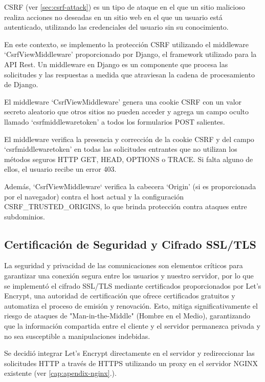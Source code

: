 CSRF (ver \ref{sec:csrf-attack}) es un tipo de ataque en el que un sitio malicioso realiza acciones no deseadas en un sitio web en el que un usuario está autenticado, utilizando las credenciales del usuario sin su conocimiento.

En este contexto, se implemento la protección CSRF utilizando el middleware `CsrfViewMiddleware' proporcionado por Django, el framework utilizado para la API Rest. Un middleware en Django es un componente que procesa las solicitudes y las respuestas a medida que atraviesan la cadena de procesamiento de Django.

El middleware `CsrfViewMiddleware' genera una cookie CSRF con un valor secreto aleatorio que otros sitios no pueden acceder y agrega un campo oculto llamado `csrfmiddlewaretoken' a todos los formularios POST salientes.

El middleware verifica la presencia y corrección de la cookie CSRF y del campo `csrfmiddlewaretoken' en todas las solicitudes entrantes que no utilizan los métodos seguros HTTP GET, HEAD, OPTIONS o TRACE. Si falta alguno de ellos, el usuario recibe un error 403.

Además, `CsrfViewMiddleware` verifica la cabecera `Origin' (si es proporcionada por el navegador) contra el host actual y la configuración CSRF\_TRUSTED\_ORIGINS, lo que brinda protección contra ataques entre subdominios.





\subsection{Certificación de Seguridad y Cifrado SSL/TLS}

La seguridad y privacidad de las comunicaciones son elementos críticos para garantizar una conexión segura entre los usuarios y nuestro servidor, por lo que se implementó el cifrado SSL/TLS mediante certificados proporcionados por Let's Encrypt, una autoridad de certificación que ofrece certificados gratuitos y automatiza el proceso de emisión y renovación.
Esto, mitiga significativamente el riesgo de ataques de "Man-in-the-Middle" (Hombre en el Medio), garantizando que la información compartida entre el cliente y el servidor permanezca privada y no sea susceptible a manipulaciones indebidas.

Se decidió integrar Let's Encrypt directamente en el servidor y redireccionar las solicitudes HTTP a través de HTTPS utilizando un proxy en el servidor NGINX existente (ver \ref{cap:apendix-nginx}.).

